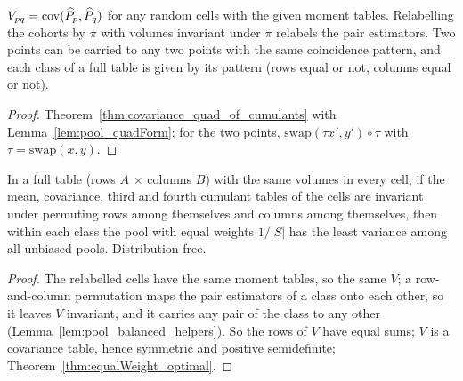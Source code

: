 \begin{lemma}\label{lem:pool_balanced_helpers}
  \leanok
  $V_{pq} = \operatorname{cov}(\widehat P_p, \widehat P_q)$ for any random cells with the given moment tables.
  Relabelling the cohorts by $\pi$ with volumes invariant under $\pi$ relabels the pair estimators.
  Two points can be carried to any two points with the same coincidence pattern, and each class of
  a full table is given by its pattern (rows equal or not, columns equal or not).
\end{lemma}
\begin{proof}
  \leanok
  Theorem~\ref{thm:covariance_quad_of_cumulants} with Lemma~\ref{lem:pool_quadForm}; for the two
  points, $\mathrm{swap}(\tau x', y') \circ \tau$ with $\tau = \mathrm{swap}(x, y)$.
\end{proof}

\begin{theorem}\label{thm:pairPool_equal_balanced}
  \leanok
  In a full table (rows $A$ $\times$ columns $B$) with the same volumes in every cell, if the
  mean, covariance, third and fourth cumulant tables of the cells are invariant under permuting
  rows among themselves and columns among themselves, then within each class the pool with equal
  weights $1/|S|$ has the least variance among all unbiased pools. Distribution-free.
\end{theorem}
\begin{proof}
  \leanok
  The relabelled cells have the same moment tables, so the same $V$; a row-and-column permutation
  maps the pair estimators of a class onto each other, so it leaves $V$ invariant, and it carries
  any pair of the class to any other (Lemma~\ref{lem:pool_balanced_helpers}). So the rows of $V$
  have equal sums; $V$ is a covariance table, hence symmetric and positive semidefinite;
  Theorem~\ref{thm:equalWeight_optimal}.
\end{proof}

